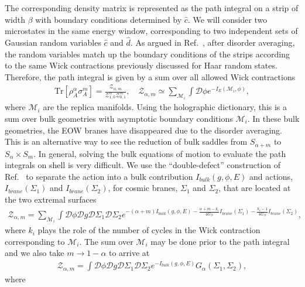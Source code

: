 \documentclass[a4paper,11pt]{article}
\newcommand{\Tr}{\text{Tr}}
\begin{document}
The corresponding density matrix is represented as the path integral on a strip of width $\beta$ with boundary conditions determined by $\hat{c}$. We will consider two microstates in the same energy window, corresponding to two independent sets of Gaussian random variables $\hat{c}$ and $\hat{d}$. As argued in Ref.~\cite{2020JHEP...11..007D}, after disorder averaging, the random variables match up the boundary conditions of the strips according to the same Wick contractions previously discussed for Haar random states. Therefore, the path integral is given by a sum over all allowed Wick contractions
\begin{align}
    \Tr \left[ \rho_A^{\alpha }\sigma_A^{m}\right] = \frac{\mathcal{Z}_{\alpha, m}}{\mathcal{Z}_{1,0}^{\alpha }\mathcal{Z}_{0,1}^{ m}}   ,\quad  \mathcal{Z}_{\alpha, m} \simeq \sum_{\mathcal{M}_i}\int \mathcal{D}\phi e^{-I_E(\mathcal{M}_i,\phi)},
\end{align}
where $\mathcal{M}_i$ are the replica manifolds. Using the holographic dictionary, this is a sum over bulk geometries with asymptotic boundary conditions $\mathcal{M}_i$. In these bulk geometries, the EOW branes have disappeared due to the disorder averaging. This is an alternative way to see the reduction of bulk saddles from $S_{\alpha + m}$ to $S_{\alpha }\times S_m$. In general, solving the bulk equations of motion to evaluate the path integrals on shell is very difficult. We use the ``double-defect'' construction of Ref.~\cite{2020JHEP...11..007D} to separate the action into a bulk contribution $I_{bulk}(g,\phi, E)$ and actions, $I_{brane}(\Sigma_1)$ and $I_{brane}(\Sigma_2)$, for cosmic branes, $\Sigma_1$ and $\Sigma_2$, that are located at the two extremal surfaces
\begin{align}
    \mathcal{Z}_{\alpha, m} = \sum_{\mathcal{M}_i}\int \mathcal{D}\phi \mathcal{D}g \mathcal{D}\Sigma_1 \mathcal{D}\Sigma_2 e^{-(\alpha + m)I_{bulk}(g,\phi, E) -\frac{\alpha + m -k_i}{4G_N}I_{brane}(\Sigma_1)-\frac{k_i-1}{4G_N}I_{brane}(\Sigma_2)},
\end{align}
where $k_i$ plays the role of the number of cycles in the Wick contraction corresponding to $\mathcal{M}_i$. The sum over $\mathcal{M}_i$ may be done prior to the path integral and we also take $m\rightarrow 1- \alpha$ to arrive at
\begin{align}
    \mathcal{Z}_{\alpha, m} =\int \mathcal{D}\phi \mathcal{D}g \mathcal{D}\Sigma_1 \mathcal{D}\Sigma_2 e^{-I_{bulk}(g,\phi, E) }G_{\alpha}(\Sigma_1,\Sigma_2),
\end{align}
where
\end{document}
